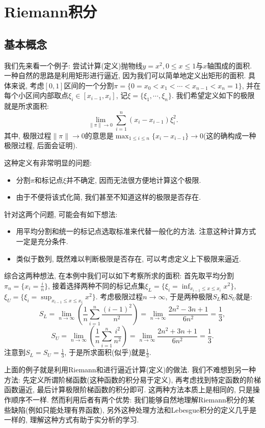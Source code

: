 \chapter{Riemann积分}

\section{基本概念}

我们先来看一个例子: 尝试计算(定义)抛物线$y=x^2,0\leq x \leq 1$与$x$轴围成的面积. 一种自然的思路是利用矩形进行逼近, 因为我们可以简单地定义出矩形的面积. 具体来说, 考虑$[0,1]$区间的一个分割$\pi = \{ 0=x_0<x_1<\cdots <x_{n-1}<x_n=1 \}$, 并在每个小区间内部取点$\xi _i \in [x_{i-1},x_i]$, 记$\xi = \{ \xi _1,\cdots ,\xi _n \}$. 我们希望定义如下的极限就是所求面积: $$\lim_{\| \pi \| \to 0} \sum_{i=1}^{n}(x_i-x_{i-1})\xi _i^2. $$
其中, 极限过程$\| \pi \| \to 0$的意思是$\max_{1\leq i \leq n} \{x_i-x_{i-1}\} \to 0$(这的确构成一种极限过程, 后面会证明). 

这种定义有非常明显的问题: 
\begin{itemize}
	\item 分割$\pi$和标记点$\xi$并不确定, 因而无法很方便地计算这个极限. 
	\item 由于不便将该式化简, 我们甚至不知道这样的极限是否存在. 
\end{itemize}
针对这两个问题, 可能会有如下想法: 
\begin{itemize}
	\item 用平均分割和统一的标记点选取标准来代替一般化的方法. 注意这种计算方式一定是充分条件. 
	\item 类似于数列, 既然难以判断极限是否存在, 可以考虑定义上下极限来逼近. 
\end{itemize}
综合这两种想法, 在本例中我们可以如下考察所求的面积: 首先取平均分割$\pi_{n}=\{ x_i=\frac{i}{n} \}$, 接着选择两种不同的标记点集$\displaystyle\xi _L = \big\{ \xi _i = \inf_{x_{i-1} \leq x \leq x_i} x^2 \big\}$, $\displaystyle\xi _U = \big\{ \xi _i = \sup_{x_{i-1} \leq x \leq x_i} x^2 \big\}$. 考虑极限过程$n\to \infty$, 于是两种极限$S_L$和$S_U$就是: $$S_L = \lim_{n\to \infty} \left( \frac{1}{n} \sum_{i=1}^{n} \frac{(i-1)^2}{n^2} \right) = \lim_{n\to \infty} \frac{2n^2-3n+1}{6n^2} = \frac{1}{3} ,  $$
$$S_U = \lim_{n\to \infty} \left( \frac{1}{n} \sum_{i=1}^{n} \frac{i^2}{n^2} \right) = \lim_{n\to \infty} \frac{2n^2+3n+1}{6n^2} = \frac{1}{3}.$$
注意到$S_L=S_U = \frac{1}{3}$, 于是所求面积(似乎)就是$\frac{1}{3}$. 

上面的例子就是利用Riemann和进行逼近计算(定义)的做法. 我们不难想到另一种方法: 先定义所谓阶梯函数(这种函数的积分易于定义), 再考虑找到特定函数的阶梯函数逼近, 最后计算极限阶梯函数的积分即可. 这两种方法本质上是相同的, 只是操作顺序不一样. 然而利用后者有两个优势: 我们能够自然地理解Riemann积分的某些缺陷(例如只能处理有界函数), 另外这种处理方法和Lebesgue积分的定义几乎是一样的, 理解这种方式有助于实分析的学习. 



